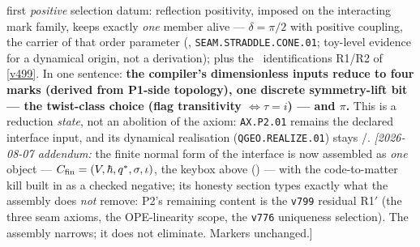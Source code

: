 \begin{keybox}
first \emph{positive} selection datum: reflection positivity, imposed on the interacting mark
family, keeps exactly \emph{one} member alive --- $\delta=\pi/2$ with positive coupling, the
carrier of that order parameter (,
\texttt{SEAM.STRADDLE.CONE.01}; toy-level evidence for a dynamical origin, not a derivation);
plus the \mC\
identifications R1/R2
of \vref{v499}. In one sentence: \textbf{the compiler's dimensionless inputs reduce to four marks
(derived from P1-side topology), one discrete symmetry-lift bit --- the twist-class choice (flag
transitivity $\iff\tau=i$) --- and $\pi$.} This is a reduction \emph{state}, not an abolition of
the axiom: \texttt{AX.P2.01} remains the declared interface input, and its dynamical realisation
(\texttt{QGEO.REALIZE.01}) stays \mC/\mO.
\emph{[2026-08-07 addendum:} the finite normal form of the interface is now assembled as
\emph{one} object --- $C_{\rm fin}=(V,\hbar,q^{*},\sigma,\iota)$, the keybox above
(\veri{v845\_cfin\_normal\_form.py}) --- with the code-to-matter kill built in as a checked
negative; its honesty section types exactly what the assembly does \emph{not} remove: P2's
remaining content is the \texttt{v799} residual R1$'$ (the three seam axioms, the OPE-linearity
scope, the \texttt{v776} uniqueness selection).  The assembly narrows; it does not eliminate.
Markers unchanged.]
\end{keybox}

